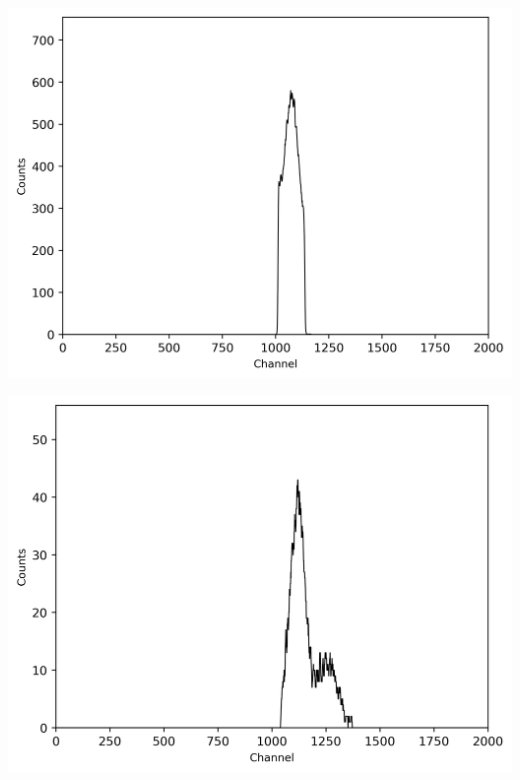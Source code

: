 \begin{multicols}{2}
\begin{center}
\begin{adjustbox}{max width=\linewidth, keepaspectratio}
        \end{adjustbox}
        \label{fig:60CoZeitspektrum60ns}
    \end{center}
\endminipage
%
\vspace{10mm}
%
\minipage{\linewidth}
    \begin{center}
        \captionsetup{type=figure}
        \begin{adjustbox}{max width=\linewidth, keepaspectratio}
            \includegraphics[]{png/60CoEnergiewindow2-peak2}
        \end{adjustbox}
        \label{fig:60CoEnergiewindow2-peak2}
    \end{center}
\endminipage
%
\vspace{10mm}
%
\minipage{\linewidth}
    \begin{center}
        \captionsetup{type=figure}
        \begin{adjustbox}{max width=\linewidth, keepaspectratio}
            \includegraphics[]{png/60CoKaskadenEnergiewindowBeiPeak2}

\end{adjustbox}
\end{center}
\end{multicols}
